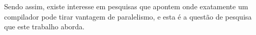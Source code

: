 Sendo assim, existe interesse em pesquisas que apontem onde exatamente um compilador
pode tirar vantagem de paralelismo, e esta é a questão de pesquisa que este
trabalho aborda.



%
%
%
